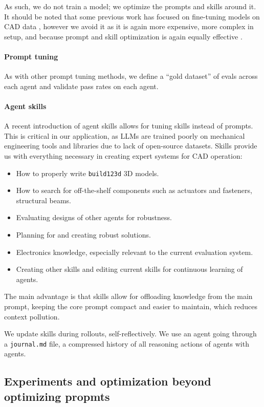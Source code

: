 \documentclass[conference]{IEEEtran}
\begin{document}
As such, we do not train a model; we optimize the prompts and skills around it. It should be noted that some previous work has focused on fine-tuning models on CAD data \cite{ref39}, however we avoid it as it is again more expensive, more complex in setup, and because prompt and skill optimization is again equally effective \cite{ref26}.

\paragraph{Prompt tuning}
As with other prompt tuning methods, we define a ``gold dataset'' of evals across each agent and validate pass rates on each agent.

\paragraph{Agent skills}
A recent introduction of agent skills allows for tuning skills instead of prompts. This is critical in our application, as LLMs are trained poorly on mechanical engineering tools and libraries due to lack of open-source datasets. Skills provide us with everything necessary in creating expert systems for CAD operation:

\begin{itemize}
    \item How to properly write \texttt{build123d} 3D models.
    \item How to search for off-the-shelf components such as actuators and fasteners, structural beams.
    \item Evaluating designs of other agents for robustness.
    \item Planning for and creating robust solutions.
    \item Electronics knowledge, especially relevant to the current evaluation system.
    \item Creating other skills and editing current skills for continuous learning of agents.
\end{itemize}

The main advantage is that skills allow for offloading knowledge from the main prompt, keeping the core prompt compact and easier to maintain, which reduces context pollution.

We update skills during rollouts, self-reflectively. We use an agent going through a \texttt{journal.md} file, a compressed history of all reasoning actions of agents with agents.

\subsection{Experiments and optimization beyond optimizing propmts}
\end{document}
